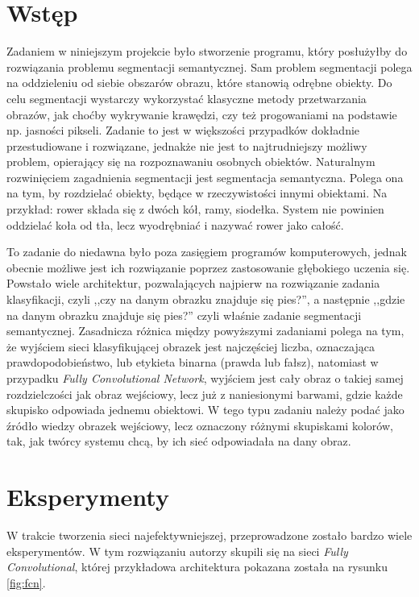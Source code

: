 \documentclass{article}
\begin{document}



\section{Wstęp}

Zadaniem w niniejszym projekcie było stworzenie programu, który posłużyłby do rozwiązania problemu segmentacji semantycznej. Sam problem segmentacji polega na oddzieleniu od siebie obszarów obrazu, które stanowią odrębne obiekty. Do celu segmentacji wystarczy wykorzystać klasyczne metody przetwarzania obrazów, jak choćby wykrywanie krawędzi, czy też progowaniami na podstawie np. jasności pikseli. Zadanie to jest w większości przypadków dokładnie przestudiowane i rozwiązane, jednakże nie jest to najtrudniejszy możliwy problem, opierający się na rozpoznawaniu osobnych obiektów. Naturalnym rozwinięciem zagadnienia segmentacji jest segmentacja semantyczna. Polega ona na tym, by rozdzielać obiekty, będące w rzeczywistości innymi obiektami. Na przykład: rower składa się z dwóch kół, ramy, siodełka. System nie powinien oddzielać koła od tła, lecz wyodrębniać i nazywać rower jako całość.

To zadanie do niedawna było poza zasięgiem programów komputerowych, jednak obecnie możliwe jest ich rozwiązanie poprzez zastosowanie głębokiego uczenia się. Powstało wiele architektur, pozwalających najpierw na rozwiązanie zadania klasyfikacji, czyli ,,czy na danym obrazku znajduje się pies?'', a następnie ,,gdzie na danym obrazku znajduje się pies?'' czyli właśnie zadanie segmentacji semantycznej. Zasadnicza różnica między powyższymi zadaniami polega na tym, że wyjściem sieci klasyfikującej obrazek jest najczęściej liczba, oznaczająca prawdopodobieństwo, lub etykieta binarna (prawda lub fałsz), natomiast w przypadku \textit{Fully Convolutional Network}, wyjściem jest cały obraz o takiej samej rozdzielczości jak obraz wejściowy, lecz już z naniesionymi barwami, gdzie każde skupisko odpowiada jednemu obiektowi. W tego typu zadaniu należy podać jako źródło wiedzy obrazek wejściowy, lecz oznaczony różnymi skupiskami kolorów, tak, jak twórcy systemu chcą, by ich sieć odpowiadała na dany obraz.

\section{Eksperymenty}

W trakcie tworzenia sieci najefektywniejszej, przeprowadzone zostało bardzo wiele eksperymentów. W tym rozwiązaniu autorzy skupili się na sieci \textit{Fully Convolutional}, której przykładowa architektura pokazana została na rysunku \ref{fig:fcn}.
\end{document}
